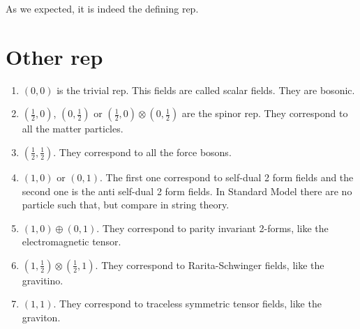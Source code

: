     As we expected, it is indeed the defining rep.

    \section{Other rep}

    \begin{enumerate}
        \item $(0, 0)$ is the trivial rep. This fields are called scalar fields. They are bosonic. 
        \item $(\frac{1}{2}, 0)$, $(0, \frac{1}{2})$ or $(\frac{1}{2}, 0) \otimes (0, \frac{1}{2})$ are the spinor rep. They correspond to all the matter particles.
        \item $(\frac{1}{2}, \frac{1}{2})$. They correspond to all the force bosons. 
        \item $(1,0)$ or $(0,1)$. The first one correspond to self-dual 2 form fields and the second one is the anti self-dual 2 form fields. In Standard Model there are no particle such that, but compare in string theory.
        \item $(1, 0) \oplus (0, 1)$. They correspond to parity invariant 2-forms, like the electromagnetic tensor.
        \item $(1,\frac{1}{2}) \otimes (\frac{1}{2}, 1)$. They correspond to Rarita-Schwinger fields, like the gravitino.
        \item $(1, 1)$. They correspond to traceless symmetric tensor fields, like the graviton.
    \end{enumerate}


